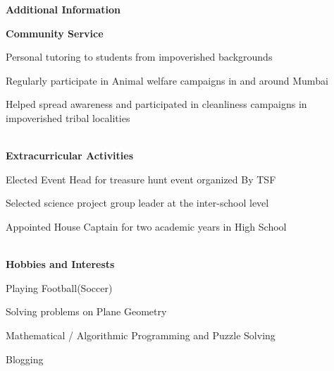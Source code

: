 \documentclass[a4paper,12pt,final]{memoir}
\newcommand{\Sep}{\vspace{1.5em}}
\newcommand{\SmallSep}{\vspace{0.5em}}
\newcommand{\CVSection}[1]
	{\Large\textbf{#1}\par
	\SmallSep\normalsize\normalfont}
\newcommand{\CVItem}[1]
	{\textbf{\color{Plum} #1}}
\begin{document}
\CVSection{Additional Information}
\CVItem{Community Service}\SmallSep\\
\begin{minipage}{13.5cm}
	\begin{compactitem}[\color{Plum}$\circ$]
		{\footnotesize
			\item Personal tutoring to students from impoverished backgrounds
			\item Regularly participate in Animal welfare campaigns in and around Mumbai
			\item Helped spread awareness and participated in cleanliness campaigns in impoverished tribal localities}
	\end{compactitem}
\end{minipage}
\SmallSep\\
\CVItem{Extracurricular Activities}\SmallSep\\
\begin{minipage}{13.5cm}
	\begin{compactitem}[\color{Plum}$\circ$]
		{\footnotesize
			\item Elected Event Head for treasure hunt event organized By TSF
			\item Selected science project group leader at the inter-school level
			\item Appointed House Captain for two academic years in High School}
	\end{compactitem}
\end{minipage}
\SmallSep\\
\CVItem{Hobbies and Interests}\SmallSep\\
\begin{minipage}{13.5cm}
	\begin{compactitem}[\color{Plum}$\circ$]
		{\footnotesize
			\item Playing Football(Soccer)
			\item Solving problems on Plane Geometry
			\item Mathematical / Algorithmic Programming and Puzzle Solving
			\item Blogging}
	\end{compactitem}
\end{minipage}
\Sep\\

\end{document}
